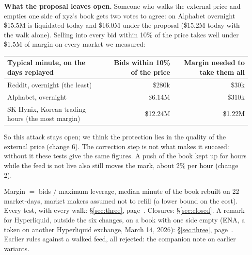 \textbf{What the proposal leaves open.} Someone who walks the external price and empties one side of xyz's book gets two votes to agree: on Alphabet overnight \$15.5M is liquidated today and \$16.0M under the proposal (\$15.2M today with the walk alone). Selling into every bid within 10\% of the price takes well under \$1.5M of margin on every market we measured:

{\small
\begin{tabularx}{\textwidth}{@{}>{\raggedright\arraybackslash}Xrr@{}}
\toprule
Typical minute, on the days replayed & Bids within 10\% of the price & Margin needed to take them all\\
\midrule
Reddit, overnight (the least) & \$280k & \$30k\\
Alphabet, overnight & \$6.14M & \$310k\\
SK Hynix, Korean trading hours (the most margin) & \$12.24M & \$1.22M\\
\bottomrule
\end{tabularx}}

So this attack stays open; we think the protection lies in the quality of the external price (change 6). The correction step is not what makes it succeed: without it these tests give the same figures. A push of the book kept up for hours while the feed is not live also still moves the mark, about 2\% per hour (change 2).

\foot
\begin{exact}[Sources]
Margin $=$ bids $/$ maximum leverage, median minute of the book rebuilt on 22 market-days, market makers assumed not to refill (a lower bound on the cost). Every test, with every walk: \S\ref{sec:three}, page~\pageref{sec:three}. Closures: \S\ref{sec:closed}. A remark for Hyperliquid, outside the six changes, on a book with one side empty (ENA, a token on another Hyperliquid exchange, March 14, 2026): \S\ref{sec:three}, page~\pageref{sec:three}. Earlier rules against a walked feed, all rejected: the companion note on earlier variants.
\end{exact}

\label{sec:costs}

